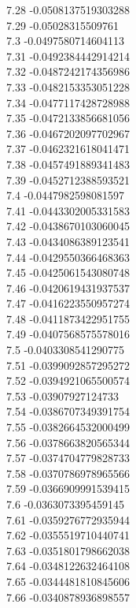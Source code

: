 {7.28	-0.0508137519303288\\
7.29	-0.05028315509761\\
7.3	-0.0497580714604113\\
7.31	-0.0492384442914214\\
7.32	-0.0487242174356986\\
7.33	-0.0482153353051228\\
7.34	-0.0477117428728988\\
7.35	-0.0472133856681056\\
7.36	-0.0467202097702967\\
7.37	-0.0462321618041471\\
7.38	-0.0457491889341483\\
7.39	-0.0452712388593521\\
7.4	-0.0447982598081597\\
7.41	-0.0443302005331583\\
7.42	-0.0438670103060045\\
7.43	-0.0434086389123541\\
7.44	-0.0429550366468363\\
7.45	-0.0425061543080748\\
7.46	-0.0420619431937537\\
7.47	-0.0416223550957274\\
7.48	-0.0411873422951755\\
7.49	-0.0407568575578016\\
7.5	-0.0403308541290775\\
7.51	-0.0399092857295272\\
7.52	-0.0394921065500574\\
7.53	-0.03907927124733\\
7.54	-0.0386707349391754\\
7.55	-0.0382664532000499\\
7.56	-0.0378663820565344\\
7.57	-0.0374704779828733\\
7.58	-0.0370786978965566\\
7.59	-0.0366909991539415\\
7.6	-0.0363073395459145\\
7.61	-0.0359276772935944\\
7.62	-0.0355519710440741\\
7.63	-0.0351801798662038\\
7.64	-0.0348122632464108\\
7.65	-0.0344481810845606\\
7.66	-0.0340878936898557\\
}
